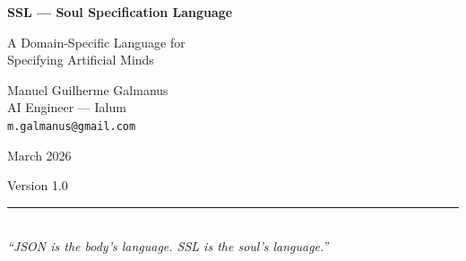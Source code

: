 \documentclass[12pt,a4paper]{article}
\theoremstyle{plain}
\theoremstyle{definition}
\theoremstyle{remark}
\begin{document}
\begin{titlepage}
\begin{center}

\vspace*{3cm}

{\Huge \textbf{SSL --- Soul Specification Language}}

\vspace{1em}

{\LARGE A Domain-Specific Language for\\[0.3em]
Specifying Artificial Minds}

\vspace{3cm}

{\Large Manuel Guilherme Galmanus}\\[0.5em]
{\normalsize AI Engineer --- Ialum}\\[0.3em]
{\small \texttt{m.galmanus@gmail.com}}

\vspace{2cm}

{\large March 2026}

\vspace{1em}

{\small Version 1.0}

\vspace{3cm}

\rule{0.5\textwidth}{0.4pt}\\[1.5em]

\textit{``JSON is the body's language. SSL is the soul's language.''}

\end{center}
\end{titlepage}
\end{document}
